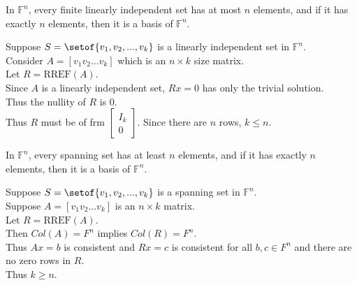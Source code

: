\documentclass[answers,12pt,addpoints]{exam}
\begin{document}
\begin{questions}
    \question 
    In $\mathbb{F}^n$, every finite linearly independent set has at most $n$ elements, and if it has exactly $n$ elements, then it is a basis of $\mathbb{F}^n$.\\
    \begin{solution}
        Suppose $S = \setof{v_1,v_2,...,v_k}$ is a linearly independent set in $\mathbb{F}^n$.\\
        Consider $A = [v_1 v_2 ... v_k]$ which is an $n \times k$ size matrix.\\
        Let $R = \text{RREF}(A)$.\\
        Since $A$ is a linearly independent set, $Rx = 0$ has only the trivial solution.\\
        Thus the nullity of $R$ is $0$.\\
        Thus $R$ must be of frm $\begin{bmatrix}
            I_k \\
            0
        \end{bmatrix}$. 
        Since there are $n$ rows, $k \leq n$.\\
    \end{solution}
    \question
    In $\mathbb{F}^n$, every spanning set has at least $n$ elements, and if it has exactly $n$ elements, then it is a basis of $\mathbb{F}^n$.\\
    \begin{solution}
        Suppose $S = \setof{v_1,v_2,...,v_k}$ is a spanning set in $\mathbb{F}^n$.\\
        Suppose $A = [v_1 v_2 ... v_k]$ is an $n \times k$ matrix.\\
        Let $R = \text{RREF}(A)$.\\
        Then $Col(A) = F^n$ implies $Col(R) = F^n$.\\
        Thus $Ax =b$ is consistent and $Rx = c$ is consistent for all $b,c \in F^n$ and there are no zero rows in $R$.\\
        Thus $k \geq n$.\\
    \end{solution}

\end{questions}
\end{document}
